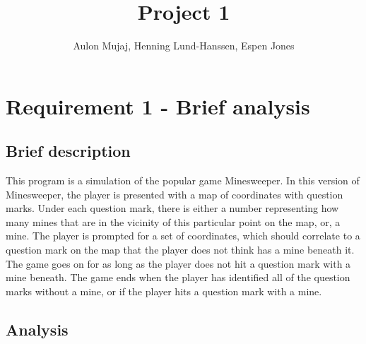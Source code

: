 \documentclass[UKenglish]{article}  %
\title{Project 1}        %
\author{Aulon Mujaj, Henning Lund-Hanssen, Espen Jones}                      %
\begin{document}
\maketitle{}

\section{Requirement 1 - Brief analysis}

\subsection{Brief description}
This program is a simulation of the popular game Minesweeper. In this version of
Minesweeper, the player is presented with a map of coordinates with
question marks. Under each question mark, there is either a number representing
how many mines that are in the vicinity of this particular point on the map, or,
a mine. The player is prompted for a set of coordinates, which should correlate
to a question mark on the map that the player does not think has a mine beneath
it. The game goes on for as long as the player does not hit a question mark with
a mine beneath. The game ends when the player has identified all of the
question marks without a mine, or if the player hits a question mark with a mine.
\subsection{Analysis}
\end{document}
